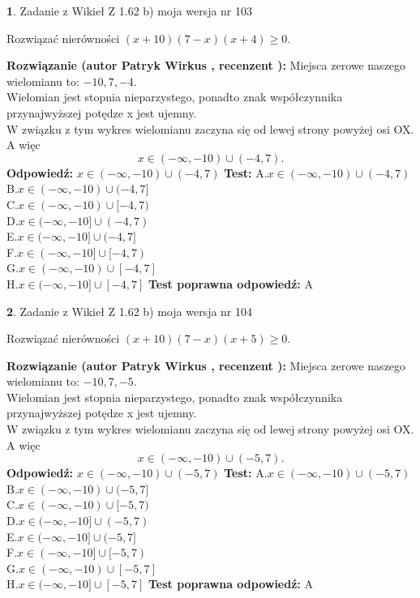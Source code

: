 \documentclass[12pt, a4paper]{article}
\theoremstyle{definition} %
\newtheorem{zad}{}
\newcommand{\zadStart}[1]{\begin{zad}#1\newline}
\newcommand{\zadStop}{\end{zad}}
\newcommand{\rozwStart}[2]{\noindent \textbf{Rozwiązanie (autor #1 , recenzent #2): }\newline}
\newcommand{\rozwStop}{\newline}
\newcommand{\odpStart}{\noindent \textbf{Odpowiedź:}\newline}
\newcommand{\odpStop}{\newline}
\newcommand{\testStart}{\noindent \textbf{Test:}\newline}
\newcommand{\testStop}{\newline}
\newcommand{\kluczStart}{\noindent \textbf{Test poprawna odpowiedź:}\newline}
\newcommand{\kluczStop}{\newline}
\begin{document}
\zadStart{Zadanie z Wikieł Z 1.62 b) moja wersja nr 103}

Rozwiązać nierówności $(x+10)(7-x)(x+4)\ge0$.
\zadStop
\rozwStart{Patryk Wirkus}{}
Miejsca zerowe naszego wielomianu to: $-10, 7, -4$.\\
Wielomian jest stopnia nieparzystego, ponadto znak współczynnika przy\linebreak najwyższej potędze x jest ujemny.\\ W związku z tym wykres wielomianu zaczyna się od lewej strony powyżej osi OX. A więc $$x \in (-\infty,-10) \cup (-4,7).$$
\rozwStop
\odpStart
$x \in (-\infty,-10) \cup (-4,7)$
\odpStop
\testStart
A.$x \in (-\infty,-10) \cup (-4,7)$\\
B.$x \in (-\infty,-10) \cup (-4,7]$\\
C.$x \in (-\infty,-10) \cup [-4,7)$\\
D.$x \in (-\infty,-10] \cup (-4,7)$\\
E.$x \in (-\infty,-10] \cup (-4,7]$\\
F.$x \in (-\infty,-10] \cup [-4,7)$\\
G.$x \in (-\infty,-10) \cup [-4,7]$\\
H.$x \in (-\infty,-10] \cup [-4,7]$
\testStop
\kluczStart
A
\kluczStop



\zadStart{Zadanie z Wikieł Z 1.62 b) moja wersja nr 104}

Rozwiązać nierówności $(x+10)(7-x)(x+5)\ge0$.
\zadStop
\rozwStart{Patryk Wirkus}{}
Miejsca zerowe naszego wielomianu to: $-10, 7, -5$.\\
Wielomian jest stopnia nieparzystego, ponadto znak współczynnika przy\linebreak najwyższej potędze x jest ujemny.\\ W związku z tym wykres wielomianu zaczyna się od lewej strony powyżej osi OX. A więc $$x \in (-\infty,-10) \cup (-5,7).$$
\rozwStop
\odpStart
$x \in (-\infty,-10) \cup (-5,7)$
\odpStop
\testStart
A.$x \in (-\infty,-10) \cup (-5,7)$\\
B.$x \in (-\infty,-10) \cup (-5,7]$\\
C.$x \in (-\infty,-10) \cup [-5,7)$\\
D.$x \in (-\infty,-10] \cup (-5,7)$\\
E.$x \in (-\infty,-10] \cup (-5,7]$\\
F.$x \in (-\infty,-10] \cup [-5,7)$\\
G.$x \in (-\infty,-10) \cup [-5,7]$\\
H.$x \in (-\infty,-10] \cup [-5,7]$
\testStop
\kluczStart
A
\kluczStop
\end{document}
